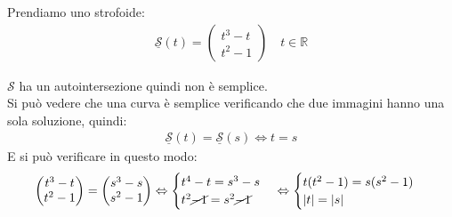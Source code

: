 \documentclass[a4paper, oneside]{article}
\begin{document}
\begin{example}
    Prendiamo uno strofoide:
    \begin{gather*}
        \underline{\mathcal{S}}(t) = \begin{pmatrix}
            t^3-t\\
            t^2-1
        \end{pmatrix}\quad t \in \mathbb{R}
    \end{gather*}
    \tiny
    \begin{center}
    \end{center}
    \normalsize
    $\mathcal{S}$ ha un autointersezione quindi non è semplice.\\
    Si può vedere che una curva è semplice verificando che due immagini hanno una sola soluzione, quindi:
    \begin{gather*}
        \underline{\mathcal{S}}(t) = \underline{\mathcal{S}}(s) \Leftrightarrow t = s
    \end{gather*}
    E si può verificare in questo modo:
    \begin{gather*}
        \begin{pmatrix}
            t^3-t\\
            t^2-1
        \end{pmatrix} =
        \begin{pmatrix}
            s^3-s\\
            s^2-1
        \end{pmatrix} \Leftrightarrow
        \begin{cases}
            t^4-t = s^3-s\\
            t^2\cancel{-1} = s^2 \cancel{-1}
        \end{cases}
        \Leftrightarrow
        \begin{cases}
            t(t^2-1) = s (s^2-1)\\
            |t| = |s|
        \end{cases}

\end{gather*}
\end{example}
\end{document}
